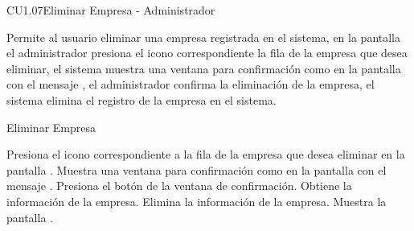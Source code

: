 \begin{UseCase}{CU1.07}{Eliminar Empresa - Administrador}{
    Permite al usuario  eliminar una empresa registrada en el sistema, en la pantalla   el administrador presiona el icono \faTrashO correspondiente la fila de la empresa que desea eliminar, el sistema muestra una ventana para confirmación como en la pantalla  con el mensaje , el administrador confirma la eliminación de la empresa, el sistema elimina el registro de la empresa en el sistema.
    
    
    
    
    \bigskip
}
		
\end{UseCase}
	
	\begin{UCtrayectoria}{Eliminar Empresa }
	
		\UCpaso[\UCactor] Presiona el icono \faTrashO correspondiente a la fila de la empresa que desea eliminar en la pantalla  .
		\UCpaso[\UCsist] Muestra una ventana para confirmación como en la pantalla  con el mensaje .
		\UCpaso[\UCactor]Presiona el botón  de la ventana de confirmación.
		\UCpaso[\UCsist] Obtiene la información de la empresa.
		\UCpaso[\UCsist] Elimina la información de la empresa.
		\UCpaso[\UCsist] Muestra la pantalla . 
       
		
	\end{UCtrayectoria}

